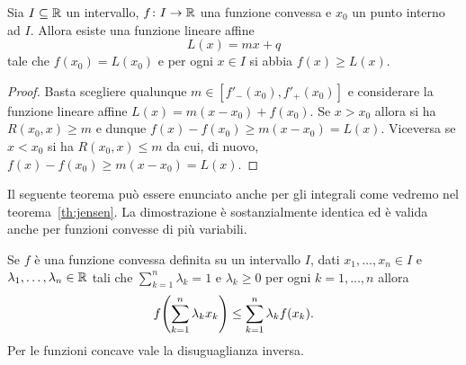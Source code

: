   \begin{theorem}
    \label{th:supporto_convessa}%
    Sia $I\subseteq {\mathbb R}$ un intervallo, $f\colon I\to{\mathbb R}$ una funzione convessa 
    e $x_0$ un punto interno ad $I$. Allora esiste una funzione lineare affine 
    \[
      L(x) = mx+q
    \]
    tale che $f(x_0) = L(x_0)$ e per ogni $x\in I$ si abbia $f(x)\ge L(x)$.
  \end{theorem}
  \begin{proof}
    Basta scegliere qualunque $m\in [f'_-(x_0),f'_+(x_0)]$ e considerare la funzione 
    lineare affine $L(x) = m(x-x_0) + f(x_0)$. Se $x>x_0$ allora si ha $R(x_0,x)\ge m$ 
    e dunque $f(x) - f(x_0) \ge m (x-x_0) = L(x)$. Viceversa se $x<x_0$ 
    si ha $R(x_0,x)\le m$ da cui, di nuovo, $f(x)-f(x_0) \ge m(x-x_0) = L(x)$.
  \end{proof}
  Il seguente teorema può essere enunciato anche per gli integrali 
  come vedremo nel teorema~\ref{th:jensen}. 
  La dimostrazione è sostanzialmente identica ed è valida anche 
  per funzioni convesse di più variabili.
  \begin{theorem}
    \mymark{*}%
    \label{th:combinazioni_baricentriche}%
    Se $f$ è una funzione convessa definita su un intervallo $I$, dati $x_1, \dots, x_n \in I$ e $\lambda_1, \dots, \lambda_n\in {\mathbb R}$ tali che $\sum_{k=1}^n \lambda_k = 1$ e $\lambda_k \ge 0$ per ogni $k=1, \dots, n$ allora
    \[
      f{\left( \sum_{k=1}^n \lambda_k x_k \right)}
      \le \sum_{k=1}^n \lambda_k f(x_k).
    \]
    Per le funzioni concave vale la disuguaglianza inversa.
    \end{theorem}
